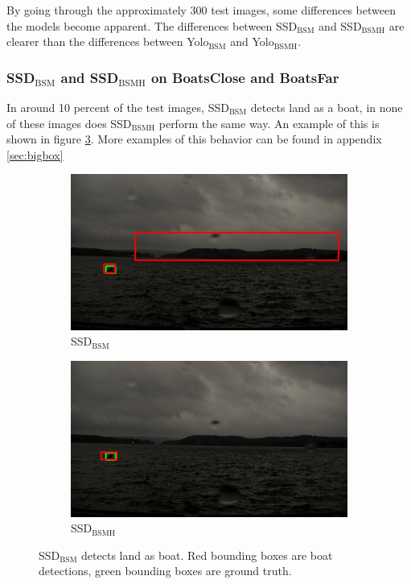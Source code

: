 \vspace{3mm}
\noindent
By going through the approximately 300 test images, some differences between the models become apparent. The differences between SSD$_{\text{BSM}}$ and SSD$_{\text{BSMH}}$ are clearer than the differences between Yolo$_{\text{BSM}}$ and Yolo$_{\text{BSMH}}$.


\subsubsection{SSD$_{\text{BSM}}$ and SSD$_{\text{BSMH}}$ on BoatsClose and BoatsFar}
In around 10 percent of the test images, SSD$_{\text{BSM}}$ detects land as a boat, in none of these images does SSD$_{\text{BSMH}}$ perform the same way. An example of this is shown in figure \ref{img:bixbox_ssd}. More examples of this behavior can be found in appendix \ref{sec:bigbox}

\begin{figure}[h!]
\begin{subfigure}{.5\textwidth}
  \centering
  \includegraphics[width=0.9\linewidth]{results/case_buildings/bigbox_bcbf/SSD2/selected_06_14_axis0049.jpg}
  \caption{SSD$_{\text{BSM}}$}
  \label{fig:big_box_ssd2}
\end{subfigure}%
\begin{subfigure}{.5\textwidth}
  \centering
  \includegraphics[width=.9\linewidth]{results/case_buildings/bigbox_bcbf/SSD3/selected_06_14_axis0049.jpg}
  \caption{SSD$_{\text{BSMH}}$}
  \label{fig:big_box_ssd3}
\end{subfigure}
\caption{SSD$_{\text{BSM}}$ detects land as boat. Red bounding boxes are boat detections, green bounding boxes are ground truth.}
\label{img:bixbox_ssd}
\end{figure}

